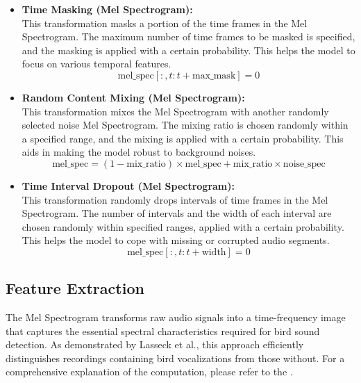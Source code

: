 \begin{itemize}
            \item \textbf{Time Masking (Mel Spectrogram):}\\
            This transformation masks a portion of the time frames in the Mel Spectrogram. The maximum number of time frames to be masked is specified, and the masking is applied with a certain probability. This helps the model to focus on various temporal features.
            \begin{equation}
            \text{mel\_spec}[:, t:t+\text{max\_mask}] = 0
            \end{equation}

            \item \textbf{Random Content Mixing (Mel Spectrogram):}\\
            This transformation mixes the Mel Spectrogram with another randomly selected noise Mel Spectrogram. The mixing ratio is chosen randomly within a specified range, and the mixing is applied with a certain probability. This aids in making the model robust to background noises.
            \begin{equation}
            \text{mel\_spec} = (1 - \text{mix\_ratio}) \times \text{mel\_spec} + \text{mix\_ratio} \times \text{noise\_spec}
            \end{equation}

            \item \textbf{Time Interval Dropout (Mel Spectrogram):}\\
            This transformation randomly drops intervals of time frames in the Mel Spectrogram. The number of intervals and the width of each interval are chosen randomly within specified ranges, applied with a certain probability. This helps the model to cope with missing or corrupted audio segments.
            \begin{equation}
            \text{mel\_spec}[:, t:t+\text{width}] = 0
            \end{equation}
      \end{itemize}

      \subsection{Feature Extraction}
      The Mel Spectrogram transforms raw audio signals into a time-frequency image that captures the essential spectral characteristics required for bird sound detection. As demonstrated by Lasseck et al.\cite{lasseck2018acoustic}, this approach efficiently distinguishes recordings containing bird vocalizations from those without. For a comprehensive explanation of the computation, please refer to the .


